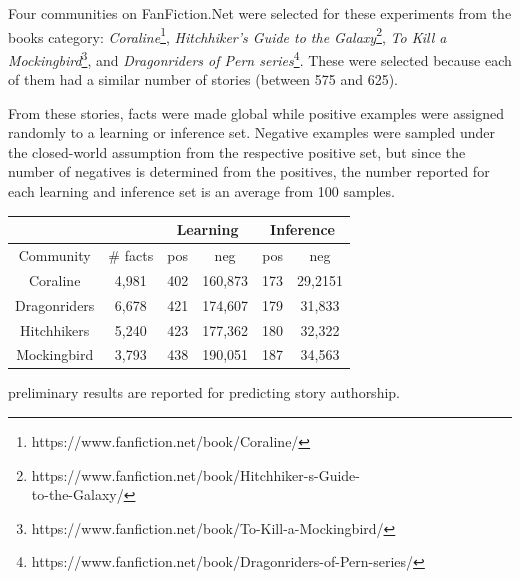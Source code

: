 \documentclass[letterpaper]{article}
\begin{document}
Four communities on FanFiction.Net were selected for these experiments from the books category: \textit{Coraline}\footnote{https://www.fanfiction.net/book/Coraline/}, \textit{Hitchhiker's Guide to the Galaxy}\footnote{https://www.fanfiction.net/book/Hitchhiker-s-Guide-\\to-the-Galaxy/}, \textit{To Kill a Mockingbird}\footnote{https://www.fanfiction.net/book/To-Kill-a-Mockingbird/}, and \textit{Dragonriders of Pern series}\footnote{https://www.fanfiction.net/book/Dragonriders-of-Pern-series/}. These were selected because each of them had a similar number of stories (between 575 and 625).

From these stories, facts were made global while positive examples were assigned randomly to a learning or inference set.  Negative examples were sampled under the closed-world assumption from the respective positive set, but since the number of negatives is determined from the positives, the number reported for each learning and inference set is an average from 100 samples.






\begin{tabular}{|c c|c c|c c|}
\hline
& & \multicolumn{2}{|c|}{Learning} & \multicolumn{2}{|c|}{Inference} \\
\hline
     Community & \# facts & pos & neg & pos & neg \\
     \hline
     Coraline & 4,981 & 402 & 160,873 & 173 & 29,2151 \\
     Dragonriders & 6,678 & 421 & 174,607 & 179 & 31,833 \\
     Hitchhikers & 5,240 & 423 & 177,362 & 180 & 32,322 \\
     Mockingbird & 3,793 & 438 & 190,051 & 187 & 34,563 \\
\hline
\end{tabular}

preliminary results are reported for predicting story authorship.
\end{document}
